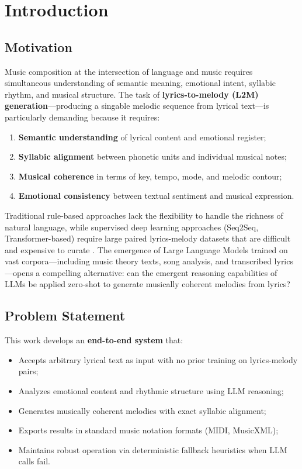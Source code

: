 \documentclass[conference]{IEEEtran}
\begin{document}
\section{Introduction}

\subsection{Motivation}

Music composition at the intersection of language and music requires
simultaneous understanding of semantic meaning, emotional intent, syllabic
rhythm, and musical structure. The task of \textbf{lyrics-to-melody (L2M)
generation}---producing a singable melodic sequence from lyrical
text---is particularly demanding because it requires:

\begin{enumerate}
  \item \textbf{Semantic understanding} of lyrical content and emotional register;
  \item \textbf{Syllabic alignment} between phonetic units and individual musical notes;
  \item \textbf{Musical coherence} in terms of key, tempo, mode, and melodic contour;
  \item \textbf{Emotional consistency} between textual sentiment and musical expression.
\end{enumerate}

Traditional rule-based approaches lack the flexibility to handle the richness
of natural language, while supervised deep learning approaches (Seq2Seq,
Transformer-based) require large paired lyrics-melody datasets that are
difficult and expensive to curate \cite{briot2020}. The emergence of Large
Language Models trained on vast corpora---including music theory texts, song
analysis, and transcribed lyrics---opens a compelling alternative: can the
emergent reasoning capabilities of LLMs be applied zero-shot to generate
musically coherent melodies from lyrics?

\subsection{Problem Statement}

This work develops an \textbf{end-to-end system} that:
\begin{itemize}
  \item Accepts arbitrary lyrical text as input with no prior training on
        lyrics-melody pairs;
  \item Analyzes emotional content and rhythmic structure using LLM reasoning;
  \item Generates musically coherent melodies with exact syllabic alignment;
  \item Exports results in standard music notation formats (MIDI, MusicXML);
  \item Maintains robust operation via deterministic fallback heuristics when
        LLM calls fail.
\end{itemize}
\end{document}
